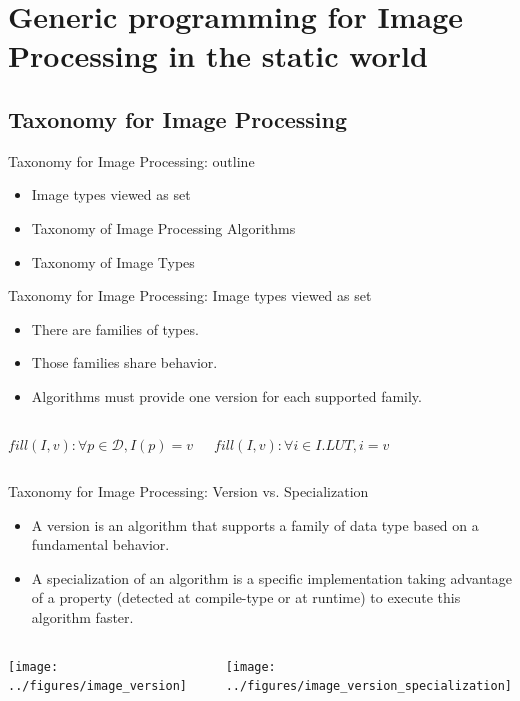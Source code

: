 \documentclass[12pt,aspectratio=169]{beamer}
\begin{document}
%
%
%
\section[Generic programming for Image Processing in the static world (contribution)]{Generic programming for Image Processing in the static world}

\subsection{Taxonomy for Image Processing}

\begin{frame}{Taxonomy for Image Processing: outline}
  \begin{itemize}
    \item Image types viewed as set
    \item Taxonomy of Image Processing Algorithms
    \item Taxonomy of Image Types
  \end{itemize}
\end{frame}

\begin{frame}{Taxonomy for Image Processing: Image types viewed as set}
  \begin{itemize}
    \item There are families of types.
    \item Those families share behavior.
    \item Algorithms must provide one version for each supported family.
  \end{itemize}
  \bigskip
  \begin{columns}[T,onlytextwidth]
    \(fill(I, v)\colon \forall{p}\in\mathcal{D}, I(p) = v\)

    \(fill(I, v)\colon \forall{i}\in I.LUT, i = v\)
  \end{columns}
\end{frame}

\begin{frame}{Taxonomy for Image Processing: Version vs. Specialization}
  \begin{itemize}
    \item A version is an algorithm that supports a family of data type based on a fundamental behavior.
    \item A specialization of an algorithm is a specific implementation taking advantage of a property (detected at
          compile-type or at runtime) to execute this algorithm faster.
  \end{itemize}
  \bigskip
  \centering
  \begin{columns}[T,onlytextwidth]
    \texttt{[image: ../figures/image\_version]}

    \texttt{[image: ../figures/image\_version\_specialization]}
  \end{columns}
\end{frame}
\end{document}
